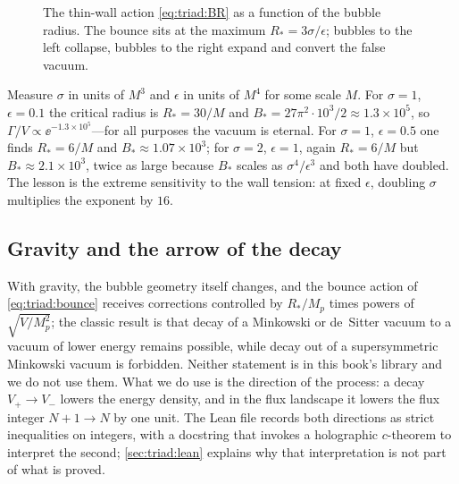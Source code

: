 \begin{figure}[ht]
\centering
{}
\caption{The thin-wall action \eqref{eq:triad:BR} as a function of the bubble radius. The
bounce sits at the maximum $R_*=3\sigma/\epsilon$; bubbles to the left collapse, bubbles to the
right expand and convert the false vacuum.}
\label{fig:triad:bounce}
\end{figure}

\begin{example}\label{ex:triad:bouncenumbers}
Measure $\sigma$ in units of $M^3$ and $\epsilon$ in units of $M^4$ for some scale $M$. For
$\sigma=1$, $\epsilon=0.1$ the critical radius is $R_*=30/M$ and $B_*=27\pi^2\cdot10^3/2
\approx1.3\times10^5$, so $\Gamma/V\propto\ee^{-1.3\times10^5}$---for all purposes the vacuum
is eternal. For $\sigma=1$, $\epsilon=0.5$ one finds $R_*=6/M$ and $B_*\approx1.07\times10^3$;
for $\sigma=2$, $\epsilon=1$, again $R_*=6/M$ but $B_*\approx2.1\times10^3$, twice as large
because $B_*$ scales as $\sigma^4/\epsilon^3$ and both have doubled. The lesson is the extreme
sensitivity to the wall tension: at fixed $\epsilon$, doubling $\sigma$ multiplies the exponent
by $16$.
\end{example}

\subsection{Gravity and the arrow of the decay}

With gravity, the bubble geometry itself changes, and the bounce action of
\eqref{eq:triad:bounce} receives corrections controlled by $R_*/M_p$ times powers of
$\sqrt{V/M_p^2}$; the classic result is that decay of a Minkowski or de~Sitter vacuum to a
vacuum of lower energy remains possible, while decay out of a supersymmetric Minkowski vacuum is
forbidden. Neither statement is in this book's library and we do not use them. What we do use
is the direction of the process: a decay $V_+\to V_-$ lowers the energy density, and in the flux
landscape it lowers the flux integer $N+1\to N$ by one unit. The Lean file
 records both directions as strict inequalities on integers, with a
docstring that invokes a holographic $c$-theorem to interpret the second; \cref{sec:triad:lean}
explains why that interpretation is not part of what is proved.

